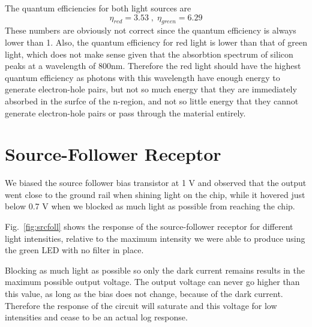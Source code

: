 The quantum efficiencies for both light sources are
\begin{equation*}
    \eta_{red} = 3.53 \; , \; \eta_{green} = 6.29
\end{equation*}
These numbers are obviously not correct since the quantum efficiency is always lower than 1. Also, the quantum efficiency for red light
is lower than that of green light, which does not make sense given that the absorbtion spectrum of silicon peaks at a wavelength of 800nm.
Therefore the red light should have the highest quantum efficiency as photons with this wavelength have enough energy to generate electron-hole
pairs, but not so much energy that they are immediately absorbed in the surfce of the n-region, and not so little energy that they cannot 
generate electron-hole pairs or pass through the material entirely.

\section{Source-Follower Receptor}
We biased the source follower bias transistor at 1 V and observed that the output went close to the ground rail when shining light on the chip,
while it hovered just below 0.7 V when we blocked as much light as possible from reaching the chip.

Fig.~\ref{fig:srcfoll} shows the response of the source-follower receptor for different light intensities, relative to the maximum intensity
we were able to produce using the green LED with no filter in place.

Blocking as much light as possible so only the dark current remains results in the maximum possible output voltage. The output voltage can never
go higher than this value, as long as the bias does not change, because of the dark current. Therefore the response of the circuit will saturate
and this voltage for low intensities and cease to be an actual log response.



